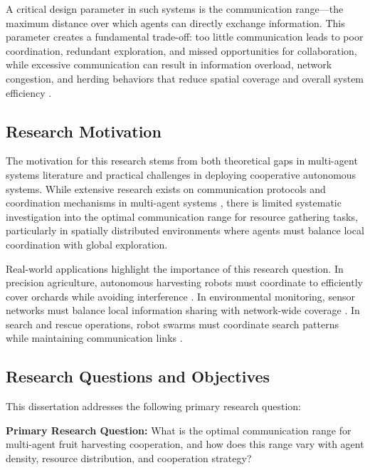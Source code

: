 \documentclass[12pt,a4paper]{article}
\begin{document}
A critical design parameter in such systems is the communication range—the maximum distance over which agents can directly exchange information. This parameter creates a fundamental trade-off: too little communication leads to poor coordination, redundant exploration, and missed opportunities for collaboration, while excessive communication can result in information overload, network congestion, and herding behaviors that reduce spatial coverage and overall system efficiency \parencite{reynolds1987flocks, vicsek1995novel}.

\subsection{Research Motivation}

The motivation for this research stems from both theoretical gaps in multi-agent systems literature and practical challenges in deploying cooperative autonomous systems. While extensive research exists on communication protocols and coordination mechanisms in multi-agent systems \parencite{stone2000multiagent, tambe1997towards}, there is limited systematic investigation into the optimal communication range for resource gathering tasks, particularly in spatially distributed environments where agents must balance local coordination with global exploration.

Real-world applications highlight the importance of this research question. In precision agriculture, autonomous harvesting robots must coordinate to efficiently cover orchards while avoiding interference \parencite{bac2014performance}. In environmental monitoring, sensor networks must balance local information sharing with network-wide coverage \parencite{akyildiz2002wireless}. In search and rescue operations, robot swarms must coordinate search patterns while maintaining communication links \parencite{murphy2008human}.

\subsection{Research Questions and Objectives}

This dissertation addresses the following primary research question:

\textbf{Primary Research Question:} What is the optimal communication range for multi-agent fruit harvesting cooperation, and how does this range vary with agent density, resource distribution, and cooperation strategy?
\end{document}
